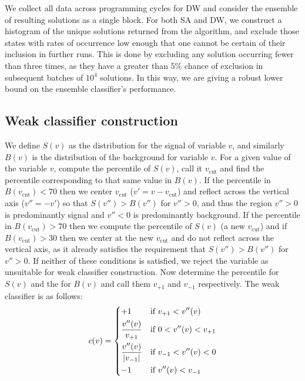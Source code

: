 \documentclass[.chapters/Higgs/.chapters/Higgs/main.tex]{subfiles}
\begin{document}
We collect all data across programming cycles for DW and consider the ensemble of resulting solutions as a single block. For both SA and DW, we construct a histogram of the unique solutions returned from the algorithm, and exclude those states with rates of occurrence low enough that one cannot be certain of their inclusion in further runs. This is done by excluding any solution occurring fewer than three times, as they have a greater than $5\%$ chance of exclusion in subsequent batches of $10^4$ solutions. In this way, we are giving a robust lower bound on the ensemble classifier's performance.

\subsection*{Weak classifier construction}
 We define $S(v)$ as the distribution for the signal of variable $v$, and similarly $B(v)$ is the distribution of the background for variable $v$. For a given value of the variable $v$, compute the  percentile of $S(v)$, call it $v_{\text{cut}}$ and find the percentile corresponding to that same value in $B(v)$. If the percentile in $B(v_{\text{cut}})<70$ then we center $v_{\text{cut}}$ ($v'=v-v_{\text{cut}}$) and reflect across the vertical axis ($v''=-v'$) so that $S(v'')>B(v'')$ for $v''>0$, and thus the region $v''>0$ is predominantly signal and $v''<0$ is predominantly background. If the percentile in $B(v_{\text{cut}})>70$ then we compute the  percentile of $S(v)$ (a new $v_{\text{cut}}$) and if $B(v_{\text{cut}})>30$ then we center at the new $v_{\text{cut}}$ and do not reflect across the  vertical axis, as it already satisfies the requirement that $S(v'')>B(v'')$ for $v''>0$. If neither of these conditions is satisfied, we reject the variable as unsuitable for weak classifier construction. Now determine the  percentile for $S(v)$ and the  for $B(v)$ and call them $v_{+1}$ and $v_{-1}$ respectively. The weak classifier is as follows:
 		\begin{equation}
		c(v) = 
 		\begin{dcases}
 			+1 & \text{if } v_{+1} < v''(v) \\
 			\frac{v''(v)}{v_{+1}} & \text{if } 0<v''(v)<v_{+1} \\
 			\frac{v''(v)}{\abs{v_{-1}}} & \text{if } v_{-1} < v''(v) < 0 \\
 			-1 & \text{if } v''(v) < v_{-1}
 		\end{dcases}
 		 \end{equation}
\end{document}
